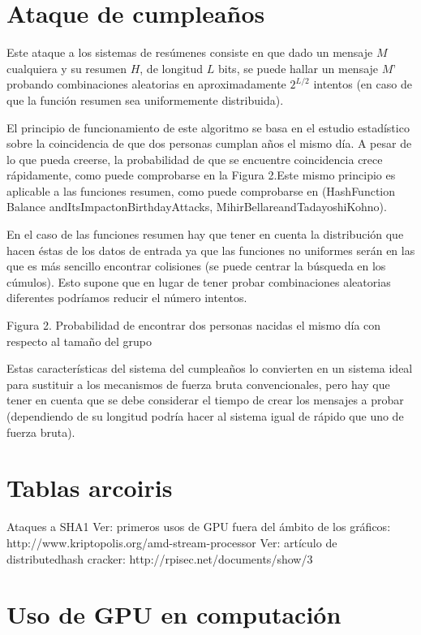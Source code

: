 \section{Ataque de cumpleaños}

Este ataque a los sistemas de resúmenes consiste en que dado un mensaje $M$ cualquiera y su resumen $H$, de longitud $L$ bits, se puede hallar un mensaje $M’$ probando combinaciones aleatorias en aproximadamente $2^{L/2}$ intentos (en caso de que la función resumen sea uniformemente distribuida).

El principio de funcionamiento de este algoritmo se basa en el estudio estadístico sobre la coincidencia de que dos personas cumplan años el mismo día. A pesar de lo que pueda creerse, la probabilidad de que se encuentre coincidencia crece rápidamente, como puede comprobarse en la Figura 2.Este mismo principio es aplicable a las funciones resumen, como puede comprobarse en (HashFunction Balance andItsImpactonBirthdayAttacks, MihirBellareandTadayoshiKohno).

En el caso de las funciones resumen hay que tener en cuenta la distribución que hacen éstas de los datos de entrada ya que las funciones no uniformes serán en las que es más sencillo encontrar colisiones (se puede centrar la búsqueda en los cúmulos). Esto supone que en lugar de tener probar   combinaciones aleatorias diferentes podríamos reducir el número intentos.
 
Figura 2. Probabilidad de encontrar dos personas nacidas el mismo día con respecto al tamaño del grupo

Estas características del sistema del cumpleaños lo convierten en un sistema ideal para sustituir a los mecanismos de fuerza bruta convencionales, pero hay que tener en cuenta que se debe considerar el tiempo de crear los mensajes a probar (dependiendo de su longitud podría hacer al sistema igual de rápido que uno de fuerza bruta).

\section{Tablas arcoiris}

Ataques a SHA1
Ver: primeros usos de GPU fuera del ámbito de los gráficos: http://www.kriptopolis.org/amd-stream-processor
Ver: artículo de distributedhash cracker: http://rpisec.net/documents/show/3

\section{Uso de GPU en computación}

